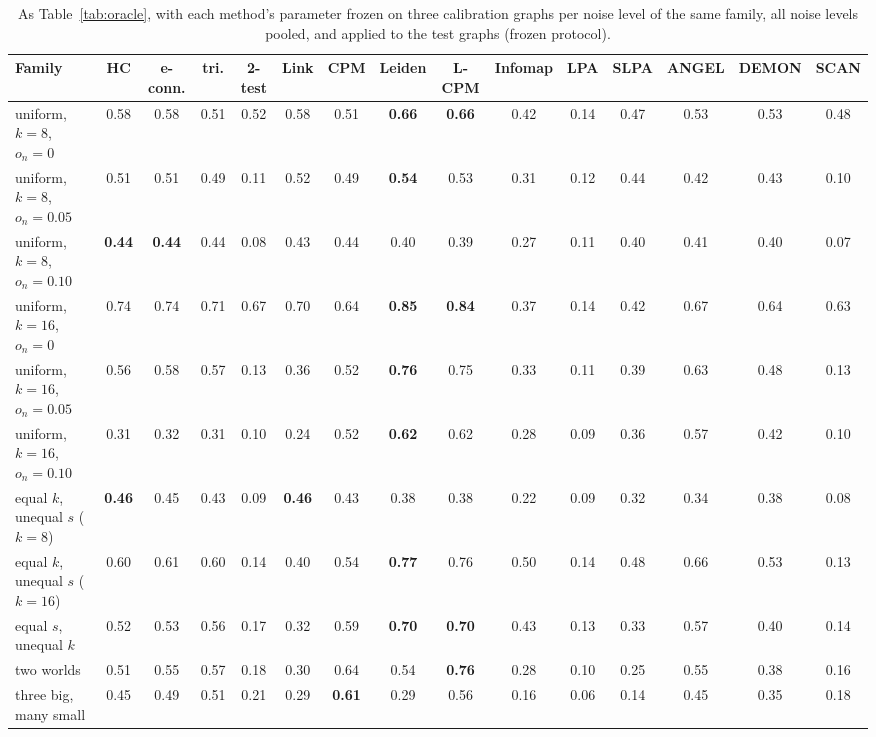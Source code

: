 \begin{table}[t]
\caption{As Table~\ref{tab:oracle}, with each method's parameter frozen on three calibration graphs per noise level of the same family, all noise levels pooled, and applied to the test graphs (frozen protocol).}
\label{tab:frozen}
\scriptsize\setlength{\tabcolsep}{2pt}
\begin{ruledtabular}
\begin{tabular}{lcccccccccccccc}
Family & HC & e-conn. & tri. & 2-test & Link & CPM & Leiden & L-CPM & Infomap & LPA & SLPA & ANGEL & DEMON & SCAN \\
\hline
uniform, $k{=}8$, $o_n{=}0$ & 0.58 & 0.58 & 0.51 & 0.52 & 0.58 & 0.51 & \textbf{0.66} & \textbf{0.66} & 0.42 & 0.14 & 0.47 & 0.53 & 0.53 & 0.48 \\
uniform, $k{=}8$, $o_n{=}0.05$ & 0.51 & 0.51 & 0.49 & 0.11 & 0.52 & 0.49 & \textbf{0.54} & 0.53 & 0.31 & 0.12 & 0.44 & 0.42 & 0.43 & 0.10 \\
uniform, $k{=}8$, $o_n{=}0.10$ & \textbf{0.44} & \textbf{0.44} & 0.44 & 0.08 & 0.43 & 0.44 & 0.40 & 0.39 & 0.27 & 0.11 & 0.40 & 0.41 & 0.40 & 0.07 \\
uniform, $k{=}16$, $o_n{=}0$ & 0.74 & 0.74 & 0.71 & 0.67 & 0.70 & 0.64 & \textbf{0.85} & \textbf{0.84} & 0.37 & 0.14 & 0.42 & 0.67 & 0.64 & 0.63 \\
uniform, $k{=}16$, $o_n{=}0.05$ & 0.56 & 0.58 & 0.57 & 0.13 & 0.36 & 0.52 & \textbf{0.76} & 0.75 & 0.33 & 0.11 & 0.39 & 0.63 & 0.48 & 0.13 \\
uniform, $k{=}16$, $o_n{=}0.10$ & 0.31 & 0.32 & 0.31 & 0.10 & 0.24 & 0.52 & \textbf{0.62} & 0.62 & 0.28 & 0.09 & 0.36 & 0.57 & 0.42 & 0.10 \\
\hline
equal $k$, unequal $s$ ($k{=}8$) & \textbf{0.46} & 0.45 & 0.43 & 0.09 & \textbf{0.46} & 0.43 & 0.38 & 0.38 & 0.22 & 0.09 & 0.32 & 0.34 & 0.38 & 0.08 \\
equal $k$, unequal $s$ ($k{=}16$) & 0.60 & 0.61 & 0.60 & 0.14 & 0.40 & 0.54 & \textbf{0.77} & 0.76 & 0.50 & 0.14 & 0.48 & 0.66 & 0.53 & 0.13 \\
equal $s$, unequal $k$ & 0.52 & 0.53 & 0.56 & 0.17 & 0.32 & 0.59 & \textbf{0.70} & \textbf{0.70} & 0.43 & 0.13 & 0.33 & 0.57 & 0.40 & 0.14 \\
two worlds & 0.51 & 0.55 & 0.57 & 0.18 & 0.30 & 0.64 & 0.54 & \textbf{0.76} & 0.28 & 0.10 & 0.25 & 0.55 & 0.38 & 0.16 \\
three big, many small & 0.45 & 0.49 & 0.51 & 0.21 & 0.29 & \textbf{0.61} & 0.29 & 0.56 & 0.16 & 0.06 & 0.14 & 0.45 & 0.35 & 0.18 \\

\end{tabular}
\end{ruledtabular}
\end{table}
